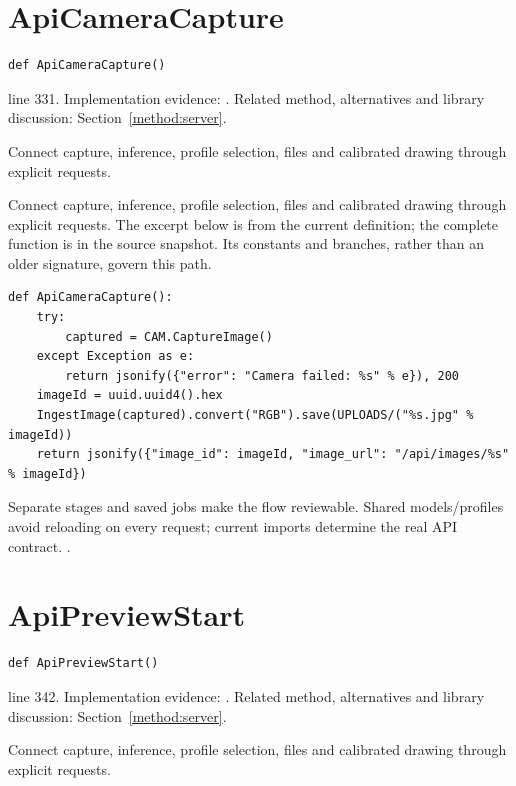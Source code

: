 \section{ApiCameraCapture}\label{fn:web-server:ApiCameraCapture}
\begin{lstlisting}[style=sig]
def ApiCameraCapture()
\end{lstlisting}
 line 331. Implementation evidence: \cite{code2026}. Related method, alternatives and library discussion: Section~\ref{method:server}.


Connect capture, inference, profile selection, files and calibrated drawing through explicit requests.


Connect capture, inference, profile selection, files and calibrated drawing through explicit requests. The excerpt below is from the current definition; the complete function is in the source snapshot. Its constants and branches, rather than an older signature, govern this path.


\begin{lstlisting}[style=plain]
def ApiCameraCapture():
    try:
        captured = CAM.CaptureImage()
    except Exception as e:
        return jsonify({"error": "Camera failed: %s" % e}), 200
    imageId = uuid.uuid4().hex
    IngestImage(captured).convert("RGB").save(UPLOADS/("%s.jpg" % imageId))
    return jsonify({"image_id": imageId, "image_url": "/api/images/%s" % imageId})
\end{lstlisting}
Separate stages and saved jobs make the flow reviewable. Shared models/profiles avoid reloading on every request; current imports determine the real API contract. \cite{flaskdocs,pillowops,code2026}.


\section{ApiPreviewStart}\label{fn:web-server:ApiPreviewStart}
\begin{lstlisting}[style=sig]
def ApiPreviewStart()
\end{lstlisting}
 line 342. Implementation evidence: \cite{code2026}. Related method, alternatives and library discussion: Section~\ref{method:server}.


Connect capture, inference, profile selection, files and calibrated drawing through explicit requests.


